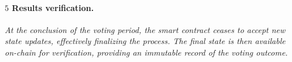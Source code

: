 \paragraph{$\boxed{5}$ Results verification.}
\textit{At the conclusion of the voting period, the smart contract ceases to accept new state updates, effectively finalizing the process. The final state is then available on-chain for verification, providing an immutable record of the voting outcome.}
